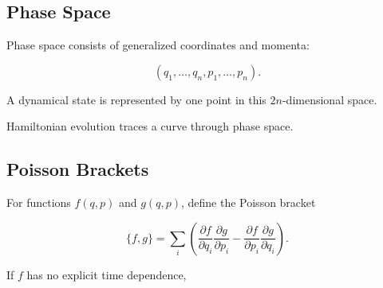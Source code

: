 
\subsection{Phase Space}
\label{subsec:physical-phase-space}

Phase space consists of generalized coordinates and momenta:

\[
\boxed{
(q_1,\ldots,q_n,p_1,\ldots,p_n).
}
\]

A dynamical state is represented by one point in this \(2n\)-dimensional
space.

Hamiltonian evolution traces a curve through phase space.

\subsection{Poisson Brackets}
\label{subsec:poisson-brackets-physics}

For functions \(f(q,p)\) and \(g(q,p)\), define the Poisson bracket

\[
\boxed{
\{f,g\}
=
\sum_i
\left(
\frac{\partial f}{\partial q_i}
\frac{\partial g}{\partial p_i}
-
\frac{\partial f}{\partial p_i}
\frac{\partial g}{\partial q_i}
\right).
}
\]

If \(f\) has no explicit time dependence,

